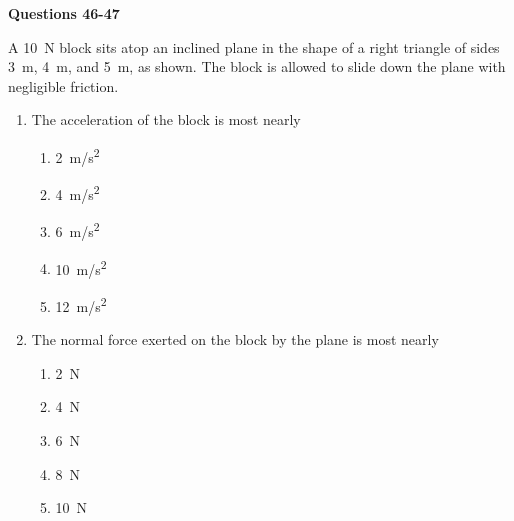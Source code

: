 \documentclass{../../oss-apphys}
\begin{document}
\begin{multicols}{2}
\begin{enumerate}[resume,leftmargin=18pt]
  \end{enumerate}
  
  \textbf{Questions 46-47}

  A \SI{10}{\newton} block sits atop an inclined plane in the shape of a
  right triangle of sides \SI{3}{\metre}, \SI{4}{\metre}, and \SI{5}{\metre},
  as shown. The block is allowed to slide down the plane with negligible
  friction.
  \vspace{-.2in}
  
  \begin{enumerate}[resume,leftmargin=18pt]
  \item The acceleration of the block is most nearly
    \begin{enumerate}[noitemsep,topsep=0pt,leftmargin=18pt,label=(\Alph*)]
    \item\SI{2}{m/s^2}
    \item\SI{4}{m/s^2}
    \item\SI{6}{m/s^2}
    \item\SI{10}{m/s^2}
    \item\SI{12}{m/s^2}
    \end{enumerate}

  \item The normal force exerted on the block by the plane is most nearly
    \begin{enumerate}[noitemsep,topsep=0pt,leftmargin=18pt,label=(\Alph*)]
    \item\SI{2}{\newton}
    \item\SI{4}{\newton}
    \item\SI{6}{\newton}
    \item\SI{8}{\newton}
    \item\SI{10}{\newton}
    \end{enumerate}
    

\end{enumerate}
\end{multicols}
\end{document}

